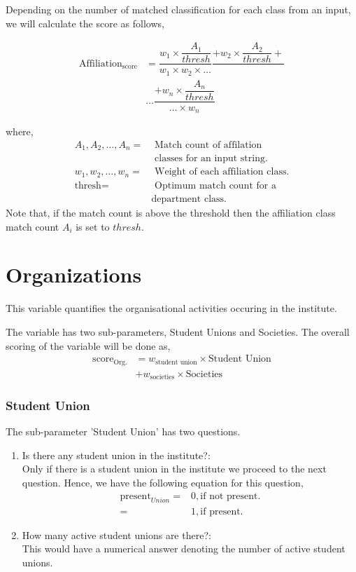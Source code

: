 \documentclass[oneside,twocolumn]{article}
\begin{document}
Depending on the number of matched classification for each
class from an input, we will calculate the score as follows,

\begin{align*}
  \text{Affiliation}_{\text{score}} &= \dfrac{w_1 \times \dfrac{A_1}{thresh}}{w_1 \times w_2 \times \dots} \dfrac{+ w_2 \times \dfrac{A_2}{thresh} +}{} \\
  &\dots \dfrac{+ w_n \times \dfrac{A_n}{thresh}}{\dots \times w_n}
\end{align*}

where,
\begin{align*}
  A_1, A_2, \dots, A_n =& \text{ Match count of affilation} \\
  & \text{ classes for an input string.} \\
  w_1, w_2, \dots, w_n =& \text{ Weight of each affiliation class.} \\
  \text{thresh} =& \text{ Optimum match count for a} \\
                &\text{department class.}
\end{align*}
Note that, if the match count is above the threshold then
the affiliation class match count \(A_i\) is set to \(thresh\).

\section{Organizations}
This variable quantifies the organisational activities
occuring in the institute.

The variable has two sub-parameters, Student Unions and
Societies. The overall scoring of the variable will be done
as,
\begin{align*}
  \text{score}_{\text{Org.}} &= w_{\text{student union}} \times \text{Student Union} \\
  &+ w_{\text{societies}} \times \text{Societies}
\end{align*}

\subsubsection{Student Union}
The sub-parameter 'Student Union' has two questions.
\begin{enumerate}
\item Is there any student union in the institute?: \\
  Only if there is a student union in the institute we
  proceed to the next question. Hence, we have the
  following equation for this question,
  \begin{align*}
    \text{present}_{Union} =& 0, \text{if not present.} \\
    =& 1, \text{if present.}
  \end{align*}
\item How many active student unions are there?: \\
  This would have a numerical answer denoting the number
  of active student unions.
\end{enumerate}
\end{document}
